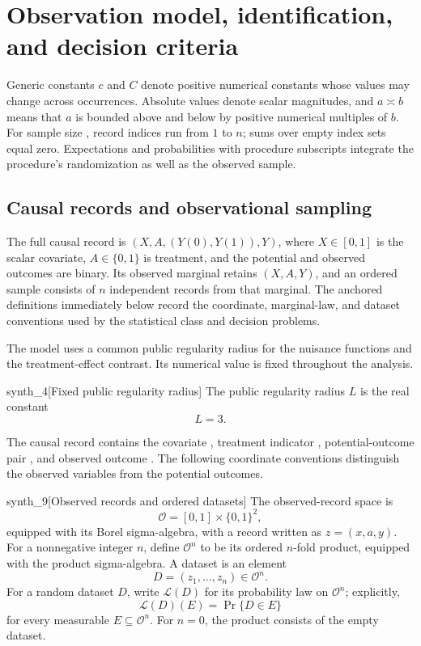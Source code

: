 \section{Observation model, identification, and decision criteria}

Generic constants \(c\) and \(C\) denote positive numerical constants whose values may change across occurrences. Absolute values denote scalar magnitudes, and \(a\asymp b\) means that \(a\) is bounded above and below by positive numerical multiples of \(b\). For sample size , record indices run from \(1\) to \(n\); sums over empty index sets equal zero. Expectations and probabilities with procedure subscripts integrate the procedure's randomization as well as the observed sample.

\subsection{Causal records and observational sampling}

The full causal record is \((X,A,(Y(0),Y(1)),Y)\), where \(X\in[0,1]\) is the scalar covariate, \(A\in\{0,1\}\) is treatment, and the potential and observed outcomes are binary. Its observed marginal retains \((X,A,Y)\), and an ordered sample consists of \(n\) independent records from that marginal. The anchored definitions immediately below record the coordinate, marginal-law, and dataset conventions used by the statistical class and decision problems.

The model uses a common public regularity radius  for the nuisance functions and the treatment-effect contrast. Its numerical value is fixed throughout the analysis.

\begin{definitionv}{synth_4}[Fixed public regularity radius]
The public regularity radius \(L\) is the real constant
\[
L = 3.
\]
\end{definitionv}

The causal record contains the covariate , treatment indicator , potential-outcome pair , and observed outcome . The following coordinate conventions distinguish the observed variables from the potential outcomes.

\begin{definitionv}{synth_9}[Observed records and ordered datasets]
The observed-record space is
\[
\mathcal O=[0,1]\times\{0,1\}^2,
\]
equipped with its Borel sigma-algebra, with a record written as \(z=(x,a,y)\). For a nonnegative integer \(n\), define \(\mathcal O^n\) to be its ordered \(n\)-fold product, equipped with the product sigma-algebra. A dataset is an element
\[
D=(z_1,\ldots,z_n)\in\mathcal O^n.
\]
For a random dataset \(D\), write \(\mathcal L(D)\) for its probability law on \(\mathcal O^n\); explicitly,
\[
\mathcal L(D)(E)=\Pr\{D\in E\}
\]
for every measurable \(E\subseteq\mathcal O^n\). For \(n=0\), the product consists of the empty dataset.
\end{definitionv}

